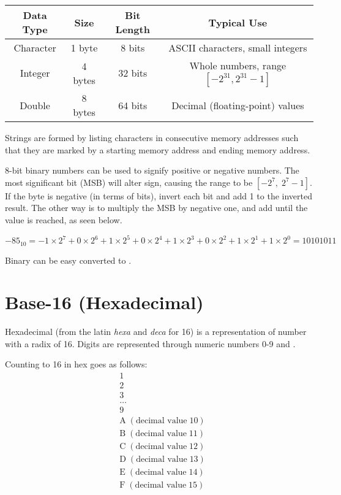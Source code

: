 \begin{center}
  
  \begin{tabular}{|c|c|c|c|}
  \hline
  \textbf{Data Type} & \textbf{Size} & \textbf{Bit Length} & \textbf{Typical Use} \\
  \hline
  Character & 1 byte & 8 bits & ASCII characters, small integers \\
  \hline
  Integer & 4 bytes & 32 bits & Whole numbers, range $[-2^{31}, 2^{31}-1]$ \\
  \hline
  Double & 8 bytes & 64 bits & Decimal (floating-point) values \\
  \hline
  \end{tabular}
\end{center}


Strings are formed by listing characters in consecutive memory addresses such that they are marked by a starting memory address and ending memory address. 

8-bit binary numbers can be used to signify positive or negative numbers.  
The most significant bit (MSB) will alter sign, causing the range to be $[-2^{7}, \; 2^{7}-1]$. If the byte is negative (in terms of bits), invert each bit and add 1 to the inverted result. The other way is to multiply the MSB by negative one, and add until the value is reached, as seen below. 

\[
-85_{10} = -1 \times 2^7 + 0 \times 2^6 + 1 \times 2^5 + 0 \times 2^4 + 1 \times 2^3 + 0 \times 2^2 + 1 \times 2^1 + 1 \times 2^0 = 1010 1011
\]

Binary can be easy converted to . 

\section{Base-16 (Hexadecimal)}
Hexadecimal (from the latin \emph{hexa} and \emph{deca} for 16) is a representation of number with a radix of 16. Digits are represented through numeric numbers 0-9 and . 

Counting to 16 in hex goes as follows:
\begin{align*}
  &1 \\
  &2 \\
  &3 \\
  &\dots \\
  &9 \\
  &\text{A} \; (\text{decimal value} \;  10) \\
  &\text{B} \; (\text{decimal value} \; 11) \\
  &\text{C} \; (\text{decimal value} \; 12) \\
  &\text{D} \; (\text{decimal value} \; 13) \\
  &\text{E} \; (\text{decimal value} \; 14) \\
  &\text{F} \; (\text{decimal value} \; 15)
\end{align*}

